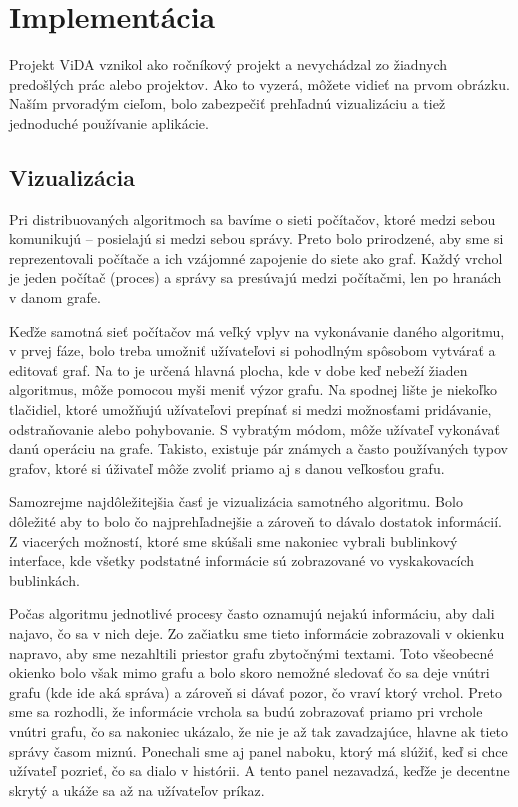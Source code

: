 \section{Implementácia}

Projekt ViDA vznikol ako ročníkový projekt a nevychádzal zo žiadnych predošlých prác alebo
projektov. Ako to vyzerá, môžete vidieť
na prvom obrázku. Naším prvoradým cieľom, bolo zabezpečiť prehľadnú vizualizáciu a tiež jednoduché
používanie aplikácie.

\subsection{Vizualizácia}

Pri distribuovaných algoritmoch sa bavíme o sieti počítačov, ktoré medzi sebou komunikujú --
posielajú si medzi sebou správy. Preto bolo prirodzené, aby sme si reprezentovali počítače a ich
vzájomné zapojenie do siete ako graf. Každý vrchol je jeden počítač (proces) a správy sa presúvajú
medzi počítačmi, len po hranách v danom grafe.

Keďže samotná sieť počítačov má veľký vplyv na vykonávanie daného algoritmu, v prvej fáze, bolo
treba umožniť užívateľovi si pohodlným spôsobom vytvárať a editovať graf. Na to je určená hlavná
plocha, kde v dobe keď nebeží žiaden algoritmus, môže pomocou myši meniť výzor grafu. Na spodnej
lište je niekoľko tlačidiel, ktoré umožňujú užívateľovi prepínať si medzi možnosťami pridávanie,
odstraňovanie alebo pohybovanie. S vybratým módom, môže užívateľ vykonávať danú operáciu na grafe.
Takisto, existuje pár známych a často používaných typov grafov, ktoré si úživateľ môže zvoliť priamo
aj s danou veľkosťou grafu.

Samozrejme najdôležitejšia časť je vizualizácia samotného algoritmu. Bolo dôležité aby to bolo čo
najprehľadnejšie a zároveň to dávalo dostatok informácií. Z viacerých možností, ktoré sme skúšali
sme nakoniec vybrali bublinkový interface, kde všetky podstatné informácie sú zobrazované vo
vyskakovacích bublinkách.

Počas algoritmu jednotlivé procesy často oznamujú nejakú informáciu, aby dali najavo, čo sa v nich
deje. Zo začiatku sme tieto informácie zobrazovali v okienku napravo, aby sme nezahltili priestor
grafu zbytočnými textami. Toto všeobecné okienko bolo však mimo grafu a bolo skoro nemožné sledovať
čo sa deje vnútri grafu (kde ide aká správa) a zároveň si dávať pozor, čo vraví ktorý vrchol. Preto
sme sa rozhodli, že informácie vrchola sa budú zobrazovať priamo pri vrchole vnútri grafu, čo sa
nakoniec ukázalo, že nie je až tak zavadzajúce, hlavne ak tieto správy časom miznú. Ponechali sme aj
panel naboku, ktorý má slúžiť, keď si chce užívateľ pozrieť, čo sa dialo v histórii. A tento panel
nezavadzá, keďže je decentne skrytý a ukáže sa až na užívateľov príkaz.


